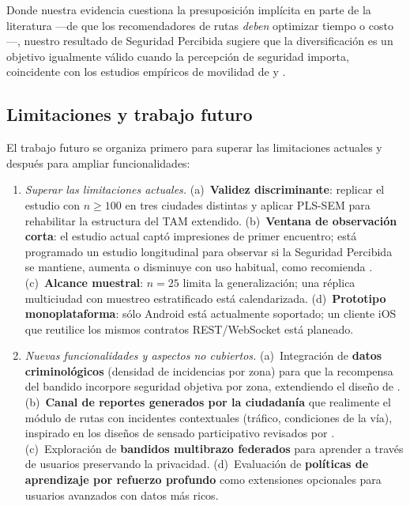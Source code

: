 \documentclass[a4paper,fleqn]{cas-sc}
\newcommand{\TAM}{TAM\xspace}
\begin{document}
	Donde nuestra evidencia cuestiona la presuposici\'on impl\'icita en parte de la literatura ---de que los recomendadores de rutas \emph{deben} optimizar tiempo o costo---, nuestro resultado de Seguridad Percibida sugiere que la diversificaci\'on es un objetivo igualmente v\'alido cuando la percepci\'on de seguridad importa, coincidente con los estudios emp\'iricos de movilidad de \citet{cagney2025urban} y \citet{liu2022route}.
	
	\subsection{Limitaciones y trabajo futuro}\label{sec:future}
	
	El trabajo futuro se organiza primero para superar las limitaciones actuales y despu\'es para ampliar funcionalidades:
	
	\begin{enumerate}
		\item \emph{Superar las limitaciones actuales.} (a)~\textbf{Validez discriminante}: replicar el estudio con $n\geq 100$ en tres ciudades distintas y aplicar PLS-SEM para rehabilitar la estructura del \TAM extendido. (b)~\textbf{Ventana de observaci\'on corta}: el estudio actual capt\'o impresiones de primer encuentro; est\'a programado un estudio longitudinal para observar si la Seguridad Percibida se mantiene, aumenta o disminuye con uso habitual, como recomienda \citet{cagney2025urban}. (c)~\textbf{Alcance muestral}: $n=25$ limita la generalizaci\'on; una r\'eplica multiciudad con muestreo estratificado est\'a calendarizada. (d)~\textbf{Prototipo monoplataforma}: s\'olo Android est\'a actualmente soportado; un cliente iOS que reutilice los mismos contratos REST/WebSocket est\'a planeado.
		\item \emph{Nuevas funcionalidades y aspectos no cubiertos.} (a)~Integraci\'on de \textbf{datos criminol\'ogicos} (densidad de incidencias por zona) para que la recompensa del bandido incorpore seguridad objetiva por zona, extendiendo el dise\~no de \citet{kim2025crimesafetymap}. (b)~\textbf{Canal de reportes generados por la ciudadan\'ia} que realimente el m\'odulo de rutas con incidentes contextuales (tr\'afico, condiciones de la v\'ia), inspirado en los dise\~nos de sensado participativo revisados por \citet{paiva2021smartmobility}. (c)~Exploraci\'on de \textbf{bandidos multibrazo federados} \citep{shi2021fedmab} para aprender a trav\'es de usuarios preservando la privacidad. (d)~Evaluaci\'on de \textbf{pol\'iticas de aprendizaje por refuerzo profundo} \citep{zhang2025drlnavigation} como extensiones opcionales para usuarios avanzados con datos m\'as ricos.
	\end{enumerate}
	
\end{document}
